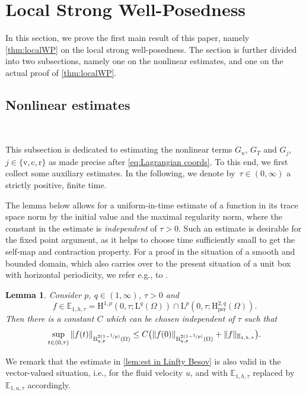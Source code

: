 \documentclass[10pt]{amsart}
\theoremstyle{plain}
\newtheorem{lem}[lem]{Lemma}
\theoremstyle{definition}
\theoremstyle{thm}
\numberwithin{equation}{section}
\newcommand{\rL}{\mathrm{L}}
\newcommand{\rLq}{\rL^q}
\newcommand{\rLp}{\rL^p}
\newcommand{\rH}{\mathrm{H}}
\newcommand{\rB}{\mathrm{B}}
\newcommand{\E}{\mathbb{E}}
\newcommand{\per}{\mathrm{per}}
\newcommand{\rr}{\mathrm{r}}
\newcommand{\rv}{\mathrm{v}}
\newcommand{\rc}{\mathrm{c}}
\begin{document}
\section{Local Strong Well-Posedness}\label{sec: local}

In this section, we prove the first main result of this paper, namely \autoref{thm:localWP} on the local strong well-posedness.
The section is further divided into two subsections, namely one on the nonlinear estimates, and one on the actual proof of \autoref{thm:localWP}.

\subsection{Nonlinear estimates}\label{ssec:nonlin ests}
\ 

This subsection is dedicated to estimating the nonlinear terms $G_u$, $G_T$ and $G_j$, $j \in \{\rv,\rc,\rr\}$ as made precise after \eqref{eq:Lagrangian coords}.
To this end, we first collect some auxiliary estimates.
In the following, we denote by~$\tau \in (0,\infty)$ a strictly positive, finite time.

The lemma below allows for a uniform-in-time estimate of a function in its trace space norm by the initial value and the maximal regularity norm, where the constant in the estimate is {\em independent} of $\tau > 0$.
Such an estimate is desirable for the fixed point argument, as it helps to choose time sufficiently small to get the self-map and contraction property.
For a proof in the situation of a smooth and bounded domain, which also carries over to the present situation of a unit box with horizontal periodicity, we refer e.g., to \cite[Thm.~2.4]{Shi:15}.

\begin{lem}\label{lem:est in Linfty Besov}
Consider $p$, $q \in (1,\infty)$, $\tau > 0$ and
\begin{equation*}
    f \in \E_{1,h,\tau} = \rH^{1,p}(0,\tau;\rLq(\Omega)) \cap \rLp(0,\tau;\rH_\per^{2,q}(\Omega)).
\end{equation*}
Then there is a constant $C$ which can be chosen independent of $\tau$ such that
\begin{equation*}
    \sup_{t \in (0,\tau)} \| f(t) \|_{\rB_{q,p}^{2(1-\nicefrac{1}{p})}(\Omega)} \le C\bigl(\| f(0) \|_{\rB_{q,p}^{2(1-\nicefrac{1}{p})}(\Omega)} + \| f \|_{\E_{1,h,\tau}}\bigr).
\end{equation*}
\end{lem}

We remark that the estimate in \autoref{lem:est in Linfty Besov} is also valid in the vector-valued situation, i.e., for the fluid velocity $u$, and with $\E_{1,h,\tau}$ replaced by $\E_{1,u,\tau}$ accordingly.
\end{document}
